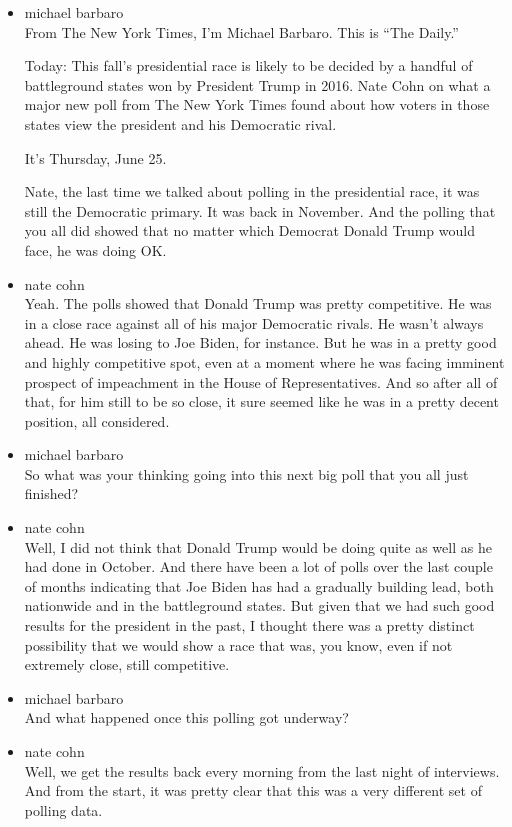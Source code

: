 \begin{itemize}
\item
  michael barbaro\\
  From The New York Times, I'm Michael Barbaro. This is ``The Daily.''

  Today: This fall's presidential race is likely to be decided by a
  handful of battleground states won by President Trump in 2016. Nate
  Cohn on what a major new poll from The New York Times found about how
  voters in those states view the president and his Democratic rival.

  It's Thursday, June 25.

  Nate, the last time we talked about polling in the presidential race,
  it was still the Democratic primary. It was back in November. And the
  polling that you all did showed that no matter which Democrat Donald
  Trump would face, he was doing OK.
\item
  nate cohn\\
  Yeah. The polls showed that Donald Trump was pretty competitive. He
  was in a close race against all of his major Democratic rivals. He
  wasn't always ahead. He was losing to Joe Biden, for instance. But he
  was in a pretty good and highly competitive spot, even at a moment
  where he was facing imminent prospect of impeachment in the House of
  Representatives. And so after all of that, for him still to be so
  close, it sure seemed like he was in a pretty decent position, all
  considered.
\item
  michael barbaro\\
  So what was your thinking going into this next big poll that you all
  just finished?
\item
  nate cohn\\
  Well, I did not think that Donald Trump would be doing quite as well
  as he had done in October. And there have been a lot of polls over the
  last couple of months indicating that Joe Biden has had a gradually
  building lead, both nationwide and in the battleground states. But
  given that we had such good results for the president in the past, I
  thought there was a pretty distinct possibility that we would show a
  race that was, you know, even if not extremely close, still
  competitive.
\item
  michael barbaro\\
  And what happened once this polling got underway?
\item
  nate cohn\\
  Well, we get the results back every morning from the last night of
  interviews. And from the start, it was pretty clear that this was a
  very different set of polling data.


\end{itemize}
